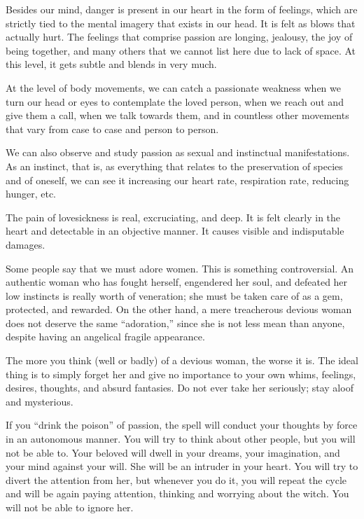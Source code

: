 \par Besides our mind, danger is present in our heart in the form of feelings, which are strictly tied to the mental imagery that exists in our head. It is felt as blows that actually hurt. The feelings that comprise passion are longing, jealousy, the joy of being together, and many others that we cannot list here due to lack of space. At this level, it gets subtle and blends in very much.

\par At the level of body movements, we can catch a passionate weakness when we turn our head or eyes to contemplate the loved person, when we reach out and give them a call, when we talk towards them, and in countless other movements that vary from case to case and person to person.

\par We can also observe and study passion as sexual and instinctual manifestations. As an instinct, that is, as everything that relates to the preservation of species and of oneself, we can see it increasing our heart rate, respiration rate, reducing hunger, etc.

\par The pain of lovesickness is real, excruciating, and deep. It is felt clearly in the heart and detectable in an objective manner. It causes visible and indisputable damages.

\par Some people say that we must adore women. This is something controversial. An authentic woman who has fought herself, engendered her soul, and defeated her low instincts is really worth of veneration; she must be taken care of as a gem, protected, and rewarded. On the other hand, a mere treacherous devious woman does not deserve the same \enquote{adoration,} since she is not less mean than anyone, despite having an angelical fragile appearance.

\par The more you think (well or badly) of a devious woman, the worse it is. The ideal thing is to simply forget her and give no importance to your own whims, feelings, desires, thoughts, and absurd fantasies. Do not ever take her seriously; stay aloof and mysterious.

\par If you \enquote{drink the poison} of passion\footnotemark[18], the spell will conduct your thoughts by force in an autonomous manner. You will try to think about other people, but you will not be able to. Your beloved will dwell in your dreams, your imagination, and your mind against your will. She will be an intruder in your heart. You will try to divert the attention from her, but whenever you do it, you will repeat the cycle and will be again paying attention, thinking and worrying about the witch. You will not be able to ignore her.

